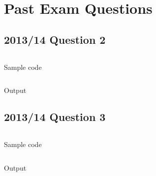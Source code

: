 \documentclass[a4paper]{article}
\begin{document}
\section{Past Exam Questions}

\subsection{2013/14 Question 2}

\begin{listing}[h!]
  \inputminted[linenos,frame=lines]{cpp}{listings/csc8501_pp1314_q2.cpp}
  \caption{Sample code}
  \label{listing:csc8501_pp1314_q2}
\end{listing}
\FloatBarrier

\begin{listing}[h!]
  \inputminted[linenos,frame=lines]{text}{out/csc8501_pp1314_q2.txt}
  \caption{Output}
  \label{listing:csc8501_pp1314_q2}
\end{listing}
\FloatBarrier

\subsection{2013/14 Question 3}

\begin{listing}[h!]
  \inputminted[linenos,frame=lines]{cpp}{listings/csc8501_pp1314_q3.cpp}
  \caption{Sample code}
  \label{listing:csc8501_pp1314_q3}
\end{listing}
\FloatBarrier

\begin{listing}[h!]
  \inputminted[linenos,frame=lines]{text}{out/csc8501_pp1314_q3.txt}
  \caption{Output}
  \label{listing:csc8501_pp1314_q3}
\end{listing}
\FloatBarrier
\end{document}
